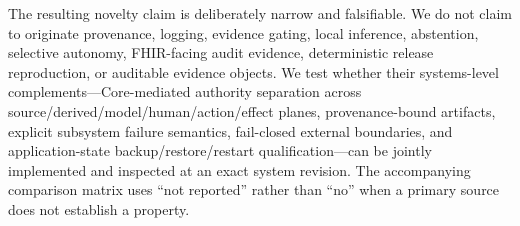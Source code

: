 The resulting novelty claim is deliberately narrow and falsifiable. We do not claim to originate provenance, logging, evidence gating, local inference, abstention, selective autonomy, FHIR-facing audit evidence, deterministic release reproduction, or auditable evidence objects. We test whether their systems-level complements---Core-mediated authority separation across source/derived/model/human/action/effect planes, provenance-bound artifacts, explicit subsystem failure semantics, fail-closed external boundaries, and application-state backup/restore/restart qualification---can be jointly implemented and inspected at an exact system revision. The accompanying comparison matrix uses ``not reported'' rather than ``no'' when a primary source does not establish a property.
